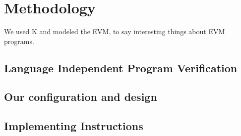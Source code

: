 \section{Methodology}
We used K and modeled the EVM, to say interesting things about EVM programs.
\subsection{Language Independent Program Verification}
\subsection{Our configuration and design}
\subsection{Implementing Instructions}

